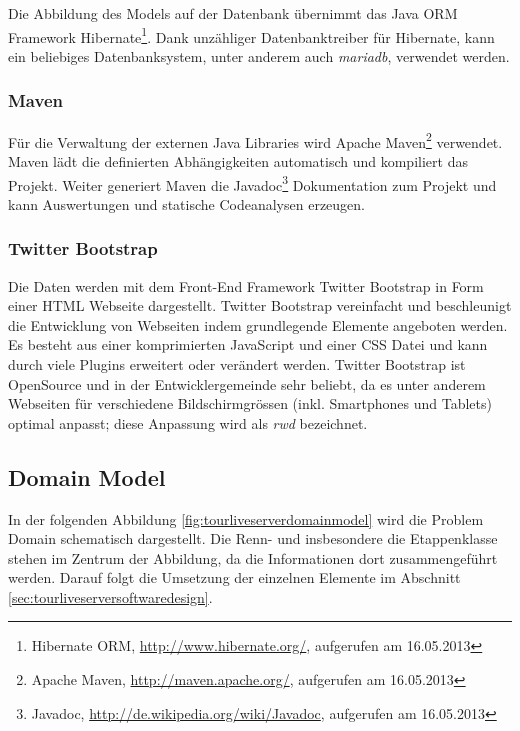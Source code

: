 Die Abbildung des Models auf der Datenbank übernimmt das Java ORM Framework Hibernate\footnote{Hibernate ORM, \url{http://www.hibernate.org/}, aufgerufen am 16.05.2013}. Dank unzähliger Datenbanktreiber für Hibernate, kann ein beliebiges Datenbanksystem, unter anderem auch \textit{\gls{mariadb}}, verwendet werden.

\subsubsection{Maven}
Für die Verwaltung der externen Java Libraries wird Apache Maven\footnote{Apache Maven, \url{http://maven.apache.org/}, aufgerufen am 16.05.2013} verwendet. Maven lädt die definierten Abhängigkeiten automatisch und kompiliert das Projekt. Weiter generiert Maven die Javadoc\footnote{Javadoc, \url{http://de.wikipedia.org/wiki/Javadoc}, aufgerufen am 16.05.2013} Dokumentation zum Projekt und kann Auswertungen und statische Codeanalysen erzeugen.

\subsubsection{Twitter Bootstrap}
Die Daten werden mit dem Front-End Framework Twitter Bootstrap in Form einer HTML Webseite dargestellt. Twitter Bootstrap vereinfacht und beschleunigt die Entwicklung von Webseiten indem grundlegende Elemente angeboten werden. Es besteht aus einer komprimierten JavaScript und einer CSS Datei und kann durch viele Plugins erweitert oder verändert werden. Twitter Bootstrap ist OpenSource und in der Entwicklergemeinde sehr beliebt, da es unter anderem Webseiten für verschiedene Bildschirmgrössen (inkl. Smartphones und Tablets) optimal anpasst; diese Anpassung wird als \textit{\gls{rwd}} bezeichnet.

\subsection{Domain Model}
In der folgenden Abbildung \ref{fig:tourliveserverdomainmodel} wird die Problem Domain schematisch dargestellt. Die Renn- und insbesondere die Etappenklasse stehen im Zentrum der Abbildung, da die Informationen dort zusammengeführt werden. Darauf folgt die Umsetzung der einzelnen Elemente im Abschnitt \ref{sec:tourliveserversoftwaredesign}.

